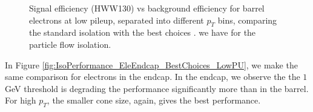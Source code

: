 \begin{figure}[!htbp]
\begin{center}
\caption{ Signal efficiency (HWW130) vs background efficiency for barrel electrons at low pileup, 
separated into different $p_{T}$ bins, comparing the standard isolation with the best choices .
we have for the particle flow isolation.}
\label{fig:IsoPerformance_EleBarrel_BestChoices_LowPU}
\end{center}
\end{figure}

\clearpage

In Figure \ref{fig:IsoPerformance_EleEndcap_BestChoices_LowPU}, we make the same comparison for 
electrons in the endcap. In the endcap, we observe the the $1$GeV threshold is degrading the 
performance significantly more than in the barrel. For high $p_{T}$, the smaller cone size, again,
gives the best performance. 



